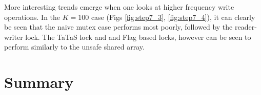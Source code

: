 \documentclass[11pt]{article}
\begin{document}
More interesting trends emerge when one looks at higher frequency write operations. In the $K=100$ case (Figs \ref{fig:step7_3}, \ref{fig:step7_4}), it can clearly be seen that the naive mutex case performs most poorly, followed by the reader-writer lock. The TaTaS lock and and Flag based locks, however can be seen to perform similarly to the unsafe shared array.

\section{Summary}
\end{document}
